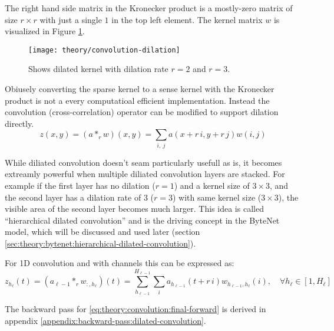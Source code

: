 The right hand side matrix in the Kronecker product is a mostly-zero matrix of size $r \times r$ with just a single $1$ in the top left element. The kernel matrix $w$ is visualized in Figure \ref{fig:convolution:dilation}.

\begin{figure}[h]
	\centering
	\texttt{[image: theory/convolution-dilation]}
	\caption{Shows dilated kernel with dilation rate $r = 2$ and $r = 3$.}
	\label{fig:convolution:dilation}
\end{figure}

Obiusely converting the sparse kernel to a sense kernel with the Kronecker product is not a every computatioal efficient implementation. Instead the convolution (cross-correlation) operator can be modified to support dilation directly.
\begin{equation}
z(x, y) = (a *_r w)(x, y) = \sum_{i,\ j} a(x + r\, i, y + r\, j) w(i, j)
\end{equation}

While diliated convolution doesn't seam particularly usefull as is, it becomes extreamly powerful when multiple diliated convolution layers are stacked. For example if the first layer has no dilation ($r = 1$) and a kernel size of $3 \times 3$, and the second layer has a dilation rate of 3 ($r = 3$) with same kernel size ($3 \times 3$), the visible area of the second layer becomes much larger. This idea is called ``hierarchical dilated convolution'' and is the driving concept in the ByteNet model, which will be discussed and used later (section \ref{sec:theory:bytenet:hierarchical-dilated-convolution}).

For 1D convolution and with channels this can be expressed as:
\begin{equation}
z_{h_\ell}(t) = (a_{\ell-1} *_r w_{:, h_\ell})(t) = \sum_{h_{\ell-1}}^{H_{\ell-1}} \sum_{i} a_{h_{\ell-1}}(t + r\,i) w_{h_{\ell-1}, h_\ell}(i), \quad \forall h_\ell \in [1, H_\ell]
\label{eq:theory:convolution:final-forward}
\end{equation}

The backward pass for \eqref{eq:theory:convolution:final-forward} is derived in appendix \ref{appendix:backward-pass:dilated-convolution}.